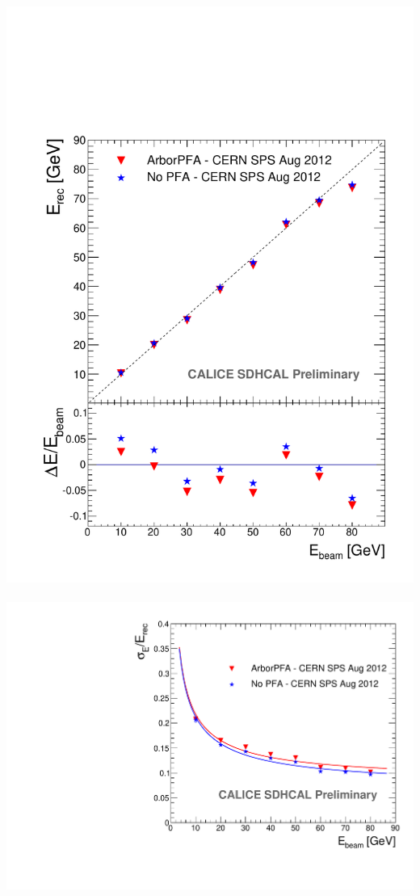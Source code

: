 \documentclass[8pt]{beamer}
\begin{document}
  \begin{frame}
  \frametitle{\secname}
  \framesubtitle{\subsecname}
    \includegraphics[width=0.45\linewidth]{SingleParticle_ERec.pdf}~
    \includegraphics[width=0.45\linewidth]{SingleParticle_EResol.pdf}
  \end{frame}
  
  
\end{document}
